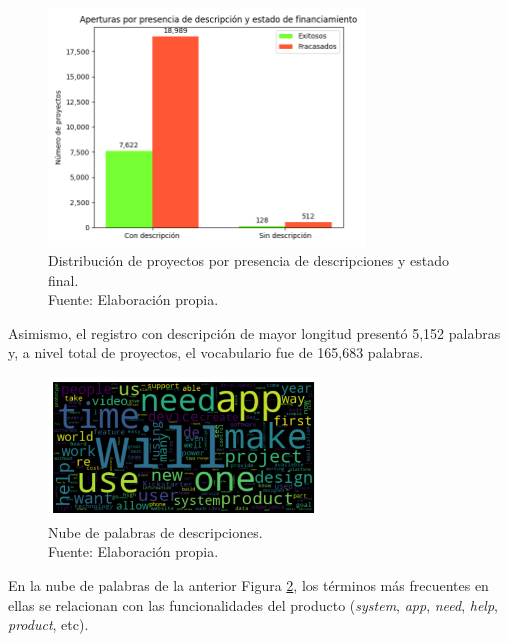 \begin{figure}[!ht]
	\begin{center}
		\includegraphics[width=0.75\textwidth]{4/figures/projects description by state.png}
		\caption[Distribución de proyectos por presencia de descripciones y estado final]{Distribución de proyectos por presencia de descripciones y estado final.\\
			Fuente: Elaboración propia.}
		\label{4:fig22}
	\end{center}
\end{figure}

Asimismo, el registro con descripción de mayor longitud presentó 5,152 palabras y, a nivel total de proyectos, el vocabulario fue de 165,683 palabras.

\begin{figure}[!ht]
	\begin{center}
		\includegraphics[width=0.64\textwidth]{4/figures/description_wordcloud_original_data.png}
		\caption[Nube de palabras de descripciones]{Nube de palabras de descripciones.\\
			Fuente: Elaboración propia.}
		\label{4:fig23}
	\end{center}
\end{figure}

En la nube de palabras de la anterior Figura \ref{4:fig23}, los términos más frecuentes en ellas se relacionan con las funcionalidades del producto (\textit{system}, \textit{app}, \textit{need}, \textit{help}, \textit{product}, etc).

